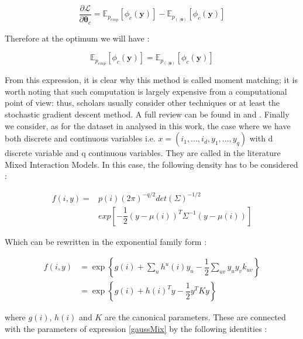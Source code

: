 \documentclass[12pt,%
               a4paper,%
               oneside,openany,%
               titlepage,%
               headinclude,footinclude,%
               BCOR5mm,%
               cleardoublepage=empty,%
               tablecaptionabove,%
               floatperchapter,
               ]{scrreprt}                 %
\begin{document}
\begin{equation}
\frac{\partial\mathcal{L}}{\partial\boldsymbol{\theta}_{c}}=\mathbb{E}_{p_{emp}}\left[\phi_{c}(\textbf{y})\right]-\mathbb{E}_{p_{(\cdot|\boldsymbol{\theta})}}\left[\phi_{c}(\textbf{y})\right]
\end{equation}

Therefore at the optimum we will have \cite{murphy2012machine}:

\begin{equation}
\mathbb{E}_{p_{emp}}\left[\phi_{c}(\textbf{y})\right]=\mathbb{E}_{p_{(\cdot|\boldsymbol{\theta})}}\left[\phi_{c}(\textbf{y})\right]
\end{equation}

From this expression, it is clear why this method is called moment matching; it is worth noting that such computation is largely expensive from a computational point of view: thus, scholars usually consider other techniques or at least the stochastic gradient descent method. A full review can be found in \cite{murphy2012machine} and \cite{koller2009probabilistic}. Finally we consider, as for the dataset in analysed in this work, the case where we have both discrete and continuous variables i.e. $x=\left(i_{1},...,i_{d},y_{1},...,y_{q} \right)$ with d discrete variable and q continuous variables. They are called in the literature Mixed Interaction Models. In this case, the following density has to be considered \cite{hojsgaard2012graphical}:

\begin{equation}
\begin{split}
f(i,y)=& p(i)(2\pi)^{-q/2}det(\Sigma)^{-1/2} \\
& exp\left[-\dfrac{1}{2}\left(y-\mu(i)\right)^{T}\Sigma^{-1}\left(y-\mu(i)\right)\right]
\end{split}
\label{gaussMix}
\end{equation}

Which can be rewritten in the exponential family form \cite{hojsgaard2012graphical}: 

\begin{equation}
\begin{split}
f(i,y) & = \exp\left\lbrace g(i)+\sum_{u}h^{u}(i)y_{u}-\dfrac{1}{2}\sum_{uv} y_{u}y_{v}k_{uv}\right\rbrace \\
&= \exp\left\lbrace g(i)+h(i)^{T}y-\dfrac{1}{2}y^{T}Ky \right\rbrace
\end{split}
\end{equation}

where $g(i)$, $h(i)$ and $K$ are the canonical parameters. These are connected with the parameters of expression \ref{gaussMix} by the following identities \cite{hojsgaard2012graphical}: 
\end{document}
